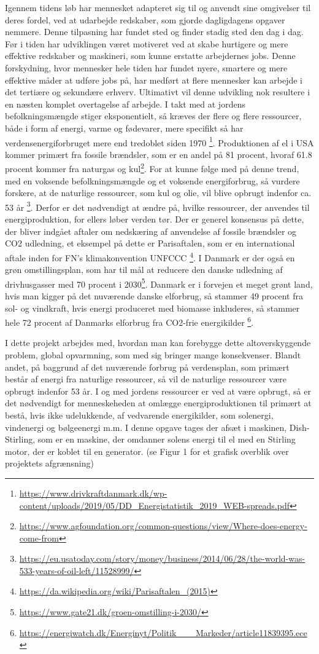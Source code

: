 \documentclass[SRC.tex]{subfiles}
\begin{document}
	Igennem tidens løb har mennesket adapteret sig til og anvendt sine omgivelser til deres fordel, ved at udarbejde redskaber, som gjorde dagligdagens opgaver nemmere. Denne tilpasning har fundet sted og finder stadig sted den dag i dag. Før i tiden har udviklingen været motiveret ved at skabe hurtigere og mere effektive redskaber og maskineri, som kunne erstatte arbejdernes jobs. Denne forskydning, hvor mennesker hele tiden har fundet nyere, smartere og mere effektive måder at udføre jobs på, har medført at flere mennesker kan arbejde i det tertiære og sekundære erhverv. Ultimativt vil denne udvikling nok resultere i en næsten komplet overtagelse af arbejde. I takt med at jordens befolkningsmængde stiger eksponentielt, så kræves der flere og flere ressourcer, både i form af energi, varme og fødevarer, mere specifikt så har verdensenergiforbruget mere end tredoblet siden 1970 \footnote{\url{https://www.drivkraftdanmark.dk/wp-content/uploads/2019/05/DD_Energistatistik_2019_WEB-spreads.pdf}}. Produktionen af el i USA kommer primært fra fossile brændsler, som er en andel på 81 procent, hvoraf 61.8 procent kommer fra naturgas og kul\footnote{\url{https://www.agfoundation.org/common-questions/view/Where-does-energy-come-from}}. For at kunne følge med på denne trend, med en voksende befolkningsmængde og et voksende energiforbrug, så vurdere forskere, at de naturlige ressourcer, som kul og olie, vil blive opbrugt indenfor ca. 53 år \footnote{\url{https://eu.usatoday.com/story/money/business/2014/06/28/the-world-was-533-years-of-oil-left/11528999/}}.  Derfor er det nødvendigt at ændre på, hvilke ressourcer, der anvendes til energiproduktion, for ellers løber verden tør. Der er generel konsensus på dette, der bliver indgået aftaler om nedskæring af anvendelse af fossile brændsler og CO2 udledning, et eksempel på dette er Parisaftalen, som er en international aftale inden for FN’s klimakonvention UNFCCC \footnote{\url{https://da.wikipedia.org/wiki/Parisaftalen_(2015)}}. I Danmark er der også en grøn omstillingsplan, som har til mål at reducere den danske udledning af drivhusgasser med 70 procent i 2030\footnote{\url{https://www.gate21.dk/groen-omstilling-i-2030/}}. Danmark er i forvejen et meget grønt land, hvis man kigger på det nuværende danske elforbrug, så stammer 49 procent fra sol- og vindkraft, hvis energi produceret med biomasse inkluderes, så stammer hele 72 procent af Danmarks elforbrug fra CO2-frie energikilder \footnote{\url{https://energiwatch.dk/Energinyt/Politik___Markeder/article11839395.ece}}.  
	
	I dette projekt arbejdes med, hvordan man kan forebygge dette altoverskyggende problem, global opvarmning, som med sig bringer mange konsekvenser. Blandt andet, på baggrund af det nuværende forbrug på verdensplan, som primært består af energi fra naturlige ressourcer, så vil de naturlige ressourcer være opbrugt indenfor 53 år. I og med jordens ressourcer er ved at være opbrugt, så er det nødvendigt for menneskeheden at omlægge energiproduktionen til primært at bestå, hvis ikke udelukkende, af vedvarende energikilder, som solenergi, vindenergi og bølgeenergi m.m. I denne opgave tages der afsæt i maskinen, Dish-Stirling, som er en maskine, der omdanner solens energi til el med en Stirling motor, der er koblet til en generator. (se Figur 1 for et grafisk overblik over projektets afgrænsning) 
\end{document}
